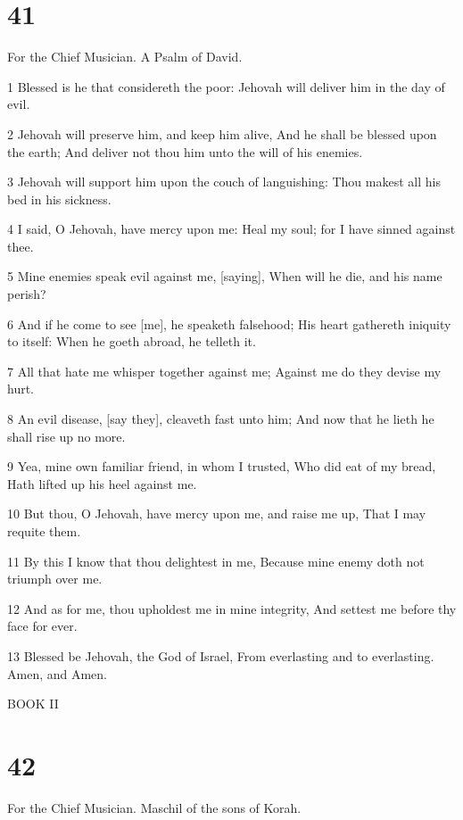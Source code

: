 \chapter{41}

\par For the Chief Musician. A Psalm of David.

\par 1 Blessed is he that considereth the poor: Jehovah will deliver him in the day of evil.
\par 2 Jehovah will preserve him, and keep him alive, And he shall be blessed upon the earth; And deliver not thou him unto the will of his enemies.
\par 3 Jehovah will support him upon the couch of languishing: Thou makest all his bed in his sickness.
\par 4 I said, O Jehovah, have mercy upon me: Heal my soul; for I have sinned against thee.
\par 5 Mine enemies speak evil against me, [saying], When will he die, and his name perish?
\par 6 And if he come to see [me], he speaketh falsehood; His heart gathereth iniquity to itself: When he goeth abroad, he telleth it.
\par 7 All that hate me whisper together against me; Against me do they devise my hurt.
\par 8 An evil disease, [say they], cleaveth fast unto him; And now that he lieth he shall rise up no more.
\par 9 Yea, mine own familiar friend, in whom I trusted, Who did eat of my bread, Hath lifted up his heel against me.
\par 10 But thou, O Jehovah, have mercy upon me, and raise me up, That I may requite them.
\par 11 By this I know that thou delightest in me, Because mine enemy doth not triumph over me.
\par 12 And as for me, thou upholdest me in mine integrity, And settest me before thy face for ever.
\par 13 Blessed be Jehovah, the God of Israel, From everlasting and to everlasting. Amen, and Amen.

\par BOOK II

\chapter{42}

\par For the Chief Musician. Maschil of the sons of Korah.

